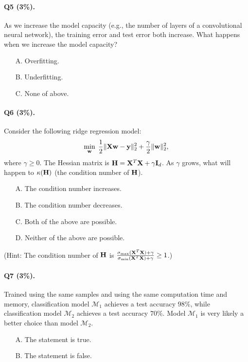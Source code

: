 \documentclass[11pt]{article}
\numberwithin{equation}{section}
\def\H{{\bf H}}
\def\I{{\bf I}}
\def\w{{\bf w}}
\def\X{{\bf X}}
\def\y{{\bf y}}
\begin{document}
\paragraph{Q5 (3\%).} 
As we increase the model capacity (e.g., the number of layers of a convolutional neural network),
the training error and test error both increase.
What happens when we increase the model capacity?
\begin{itemize}
	\item[A.] Overfitting.
	\item[B.] Underfitting.
	\item[C.] None of above.
\end{itemize}



\paragraph{Q6 (3\%).} 
Consider the following ridge regression model:
\begin{equation*}
\min_{\w} \; \frac{1}{2}\| \X \w - \y \|_2^2  + \frac{\gamma}{2} \| \w \|_2^2 ,
\end{equation*}
where $\gamma \geq 0$.
The Hessian matrix is $\H = \X^T \X + \gamma \I_d$.
As $\gamma$ grows, what will happen to $\kappa (\H)$ (the condition number of $\H$).
\begin{itemize}
	\item[A.]
	The condition number increases.
	\item[B.]
	The condition number decreases.
	\item[C.]
	Both of the above are possible.
	\item[D.]
	Neither of the above are possible.
\end{itemize}
(Hint: The condition number of $\H$ is $\frac{ \sigma_{\max} (\X^T \X) + \gamma }{ \sigma_{\min} (\X^T \X) + \gamma } \geq 1$.)





\paragraph{Q7 (3\%).} 
Trained using the same samples and using the same computation time and memory,
classification model $\mathcal{M}_1$ achieves a test accuracy $98\%$,
while classification model $\mathcal{M}_2$ achieves a test accuracy $70\%$.
Model $\mathcal{M}_1$ is very likely a better choice than model $\mathcal{M}_2$.
\begin{itemize}
	\item[A.]
	The statement is true.
	\item[B.]
	The statement is false.
\end{itemize}
\end{document}
